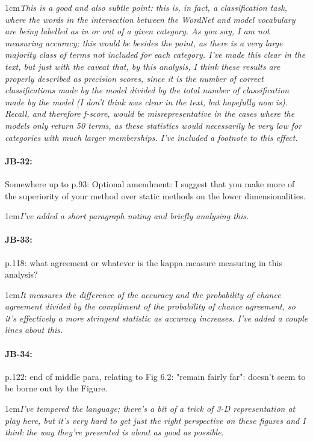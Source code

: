 \documentclass[11pt,a4paper]{article}
\newcommand{\res}[1]{\vspace{0.25cm} \begin{adjustwidth}{1cm}{}\emph{#1}\end{adjustwidth}}
\begin{document}
\res{This is a good and also subtle point: this is, in fact, a classification task, where the words in the intersection between the WordNet and model vocabulary are being labelled as in or out of a given category.  As you say, I am not measuring accuracy; this would be besides the point, as there is a very large majority class of terms not included for each category.  I've made this clear in the text, but just with the caveat that, by this analysis, I think these results are properly described as precision scores, since it is the number of correct classifications made by the model divided by the total number of classification made by the model (I don't think was clear in the text, but hopefully now is).  Recall, and therefore f-score, would be misrepresentative in the cases where the models only return 50 terms, as these statistics would necessarily be very low for categories with much larger memberships.  I've included a footnote to this effect.}

\paragraph{JB-32:} Somewhere up to p.93: Optional amendment: I suggest that you make more of the superiority of your method over static methods on the lower dimensionalities.

\res{I've added a short paragraph noting and briefly analysing this.}

\paragraph{JB-33:} p.118: what agreement or whatever is the kappa measure measuring in this analysis?

\res{It measures the difference of the accuracy and the probability of chance agreement divided by the compliment of the probability of chance agreement, so it's effectively a more stringent statistic as accuracy increases.  I've added a couple lines about this.}

\paragraph{JB-34:} p.122: end of middle para, relating to Fig 6.2: "remain fairly far": doesn't seem to be borne out by the Figure.

\res{I've tempered the language; there's a bit of a trick of 3-D representation at play here, but it's very hard to get just the right perspective on these figures and I think the way they're presented is about as good as possible.}
\end{document}
